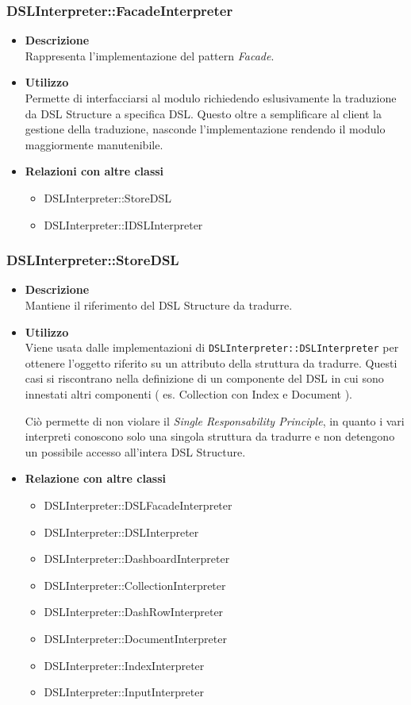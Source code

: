 \subsubsection{DSLInterpreter::FacadeInterpreter}
\begin{itemize}
\item \textbf{Descrizione} \hfill \\
  Rappresenta l'implementazione del pattern \textit{Facade}.
\item \textbf{Utilizzo} \hfill \\
  Permette di interfacciarsi al modulo richiedendo eslusivamente la traduzione da DSL Structure a specifica DSL. Questo oltre a semplificare al client la gestione della traduzione, nasconde l'implementazione rendendo il modulo maggiormente manutenibile.
\item \textbf{Relazioni con altre classi} \hfill
  \begin{itemize}
  \item DSLInterpreter::StoreDSL
  \item DSLInterpreter::IDSLInterpreter
  \end{itemize}
\end{itemize}
\subsubsection{DSLInterpreter::StoreDSL}
\begin{itemize}
\item \textbf{Descrizione} \hfill \\
  Mantiene il riferimento del DSL Structure da tradurre.
\item \textbf{Utilizzo} \hfill \\
  Viene usata dalle implementazioni di \texttt{DSLInterpreter::DSLInterpreter} per ottenere l'oggetto riferito su un attributo della struttura da tradurre. Questi casi si riscontrano nella definizione di un componente del DSL in cui sono innestati altri componenti ( es. Collection con Index e Document ).

  Ciò permette di non violare il \textit{Single Responsability Principle}, in quanto i vari interpreti conoscono solo una singola struttura da tradurre e non detengono un possibile accesso all'intera DSL Structure.
\item \textbf{Relazione con altre classi} \hfill
  \begin{itemize}
  \item DSLInterpreter::DSLFacadeInterpreter
  \item DSLInterpreter::DSLInterpreter
  \item DSLInterpreter::DashboardInterpreter
  \item DSLInterpreter::CollectionInterpreter
  \item DSLInterpreter::DashRowInterpreter
  \item DSLInterpreter::DocumentInterpreter
  \item DSLInterpreter::IndexInterpreter
  \item DSLInterpreter::InputInterpreter
  \end{itemize}
\end{itemize}

